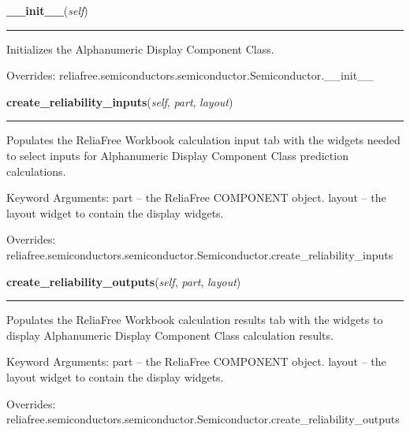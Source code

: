 \hspace{.8\funcindent}\begin{boxedminipage}{\funcwidth}

    \raggedright \textbf{\_\_init\_\_}(\textit{self})

    \vspace{-1.5ex}

    \rule{\textwidth}{0.5\fboxrule}
\setlength{\parskip}{2ex}
    Initializes the Alphanumeric Display Component Class.

\setlength{\parskip}{1ex}
      Overrides: reliafree.semiconductors.semiconductor.Semiconductor.\_\_init\_\_

    \end{boxedminipage}

    \vspace{0.5ex}

\hspace{.8\funcindent}\begin{boxedminipage}{\funcwidth}

    \raggedright \textbf{create\_reliability\_inputs}(\textit{self}, \textit{part}, \textit{layout})

    \vspace{-1.5ex}

    \rule{\textwidth}{0.5\fboxrule}
\setlength{\parskip}{2ex}
    Populates the ReliaFree Workbook calculation input tab with the widgets
    needed to select inputs for Alphanumeric Display Component Class 
    prediction calculations.

    Keyword Arguments: part   -- the ReliaFree COMPONENT object. layout -- 
    the layout widget to contain the display widgets.

\setlength{\parskip}{1ex}
      Overrides: reliafree.semiconductors.semiconductor.Semiconductor.create\_reliability\_inputs

    \end{boxedminipage}

    \vspace{0.5ex}

\hspace{.8\funcindent}\begin{boxedminipage}{\funcwidth}

    \raggedright \textbf{create\_reliability\_outputs}(\textit{self}, \textit{part}, \textit{layout})

    \vspace{-1.5ex}

    \rule{\textwidth}{0.5\fboxrule}
\setlength{\parskip}{2ex}
    Populates the ReliaFree Workbook calculation results tab with the 
    widgets to display Alphanumeric Display Component Class calculation 
    results.

    Keyword Arguments: part   -- the ReliaFree COMPONENT object. layout -- 
    the layout widget to contain the display widgets.

\setlength{\parskip}{1ex}
      Overrides: reliafree.semiconductors.semiconductor.Semiconductor.create\_reliability\_outputs

    \end{boxedminipage}

